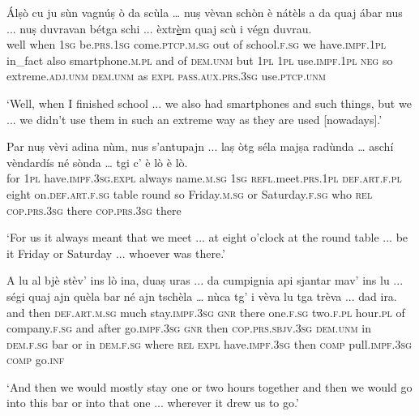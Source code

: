 \begin{linenumbers}
	\gll  Álṣò cu ju sùn vagnúṣ ò da scùla … nuṣ vèvan schòn è nátèls a da quaj ábar nus ... nuṣ duvravan bétga schi ... èxtr\underline{è}m quaj scù i végn duvrau.  \\
well when \textsc{1sg} be.\textsc{prs.1sg} come.\textsc{ptcp.m.sg} out of school.\textsc{f.sg} {} we have.\textsc{impf.1pl} in\_fact also smartphone.\textsc{m.pl} and of \textsc{dem.unm} but \textsc{1pl} {} \textsc{1pl} use.\textsc{impf.1pl} \textsc{neg} so {} extreme.\textsc{adj.unm} \textsc{dem.unm} as \textsc{expl} \textsc{pass.aux.prs.3sg} use.\textsc{ptcp.unm}\\
\end{linenumbers}
\medskip
\glt `Well, when I finished school ... we also had smartphones and such things, but we ... we didn't use them in such an extreme way as they are used [nowadays].'
\medskip

\begin{linenumbers}
	\gll Par nuṣ vèvi adina nùm, nus s’antupajn ... laṣ òtg séla majṣa radùnda … aschí vèndardís né sònda … tgi c’ è lò è lò.   \\
for \textsc{1pl} have.\textsc{impf.3sg.expl} always name.\textsc{m.sg} \textsc{1sg} \textsc{refl}.meet.\textsc{prs.1pl} {} \textsc{def.art.f.pl} eight on.\textsc{def.art.f.sg} table round {} so Friday.\textsc{m.sg} or Saturday.\textsc{f.sg} {} who \textsc{rel} \textsc{cop.prs.3sg} there \textsc{cop.prs.3sg} there	\\
\end{linenumbers}
\medskip
\glt `For us it always meant that we meet ... at eight o'clock at the round table ... be it Friday or Saturday ... whoever was there.'
\medskip

\begin{linenumbers}
	\gll  A lu al bjè stèv’ ins lò ina, duaṣ uras ... da cumpignia api sjantar mav’ ins lu ... ségi quaj ajn quèla bar né ajn tschèla … nùca tg’ i vèva lu tga trèva ... dad ira.  \\
	and then \textsc{def.art.m.sg} much stay.\textsc{impf.3sg} \textsc{gnr} there one.\textsc{f.sg} two.\textsc{f.pl} hour.\textsc{pl} {} of company.\textsc{f.sg} and after go.\textsc{impf.3sg} \textsc{gnr} then {} \textsc{cop.prs.sbjv.3sg} \textsc{dem.unm} in \textsc{dem.f.sg} bar or in \textsc{dem.f.sg} {} where \textsc{rel} \textsc{expl} have.\textsc{impf.3sg} then \textsc{comp} pull.\textsc{impf.3sg} {} \textsc{comp} go.\textsc{inf}\\
\end{linenumbers}
\medskip
\glt `And then we would mostly stay one or two hours together and then we would go into this bar or into that one ... wherever it drew us to go.'
\medskip

